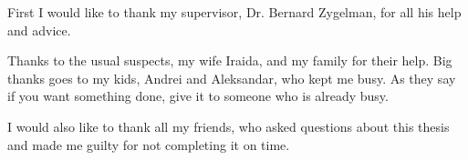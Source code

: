 
First I would like to thank my supervisor, Dr. Bernard Zygelman, for all his help and advice.

Thanks to the usual suspects, my wife Iraida, and my family for their help. Big thanks goes to my kids, Andrei and Aleksandar, who kept me busy. As they say if you want something done, give it to someone who is already busy.

I would also like to thank all my friends, who asked questions about this thesis and made me guilty for not completing it on time.
